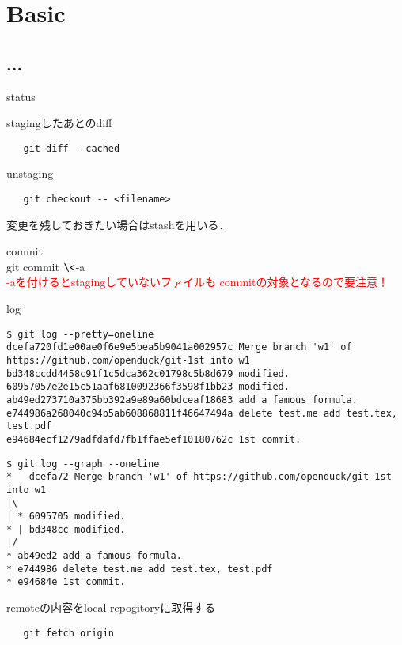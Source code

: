 \documentclass[b5j,landscape]{jsarticle}
\begin{document}
\section{Basic}
\subsection{...}

\begin{description}
\item status \\ 

\item stagingしたあとのdiff
\begin{verbatim}
   git diff --cached
\end{verbatim}

\item unstaging
\begin{verbatim}
   git checkout -- <filename>
\end{verbatim}
変更を残しておきたい場合はstashを用いる．
\\

\item commit \\
   git commit $\<$-a$\>$
   \\
  \textcolor{red}{
     -aを付けるとstagingしていないファイルも
     commitの対象となるので要注意！
  }

\item log
\begin{verbatim}
$ git log --pretty=oneline
dcefa720fd1e00ae0f6e9e5bea5b9041a002957c Merge branch 'w1' of https://github.com/openduck/git-1st into w1
bd348ccdd4458c91f1c5dca362c01798c5b8d679 modified.
60957057e2e15c51aaf6810092366f3598f1bb23 modified.
ab49ed273710a375bb392a9e89a60bdceaf18683 add a famous formula.
e744986a268040c94b5ab608868811f46647494a delete test.me add test.tex, test.pdf
e94684ecf1279adfdafd7fb1ffae5ef10180762c 1st commit.
\end{verbatim}

\begin{verbatim}
$ git log --graph --oneline
*   dcefa72 Merge branch 'w1' of https://github.com/openduck/git-1st into w1
|\  
| * 6095705 modified.
* | bd348cc modified.
|/  
* ab49ed2 add a famous formula.
* e744986 delete test.me add test.tex, test.pdf
* e94684e 1st commit.
\end{verbatim}



\item remoteの内容をlocal repogitoryに取得する
\begin{verbatim}
   git fetch origin
\end{verbatim}



\end{description}
\end{document}
